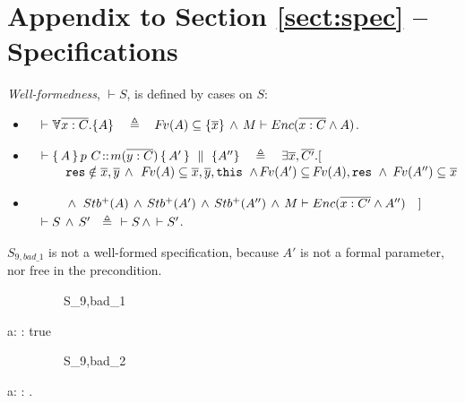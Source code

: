 \section{Appendix to Section \ref{sect:spec} -- Specifications}
\label{app:spec}


\begin{definition}      {\emph{Well-formedness}},  $\vdash S$,  is   defined by cases on $S$:\\
\label{f:holistic-wff}

\begin{itemize}
\item
  $\strut \ \  \vdash {\TwoStatesN {\overline {x:C}} {A}} \ \ \ \triangleq\  \ \ \fv(A)\subseteq\{  \overline x \}\,\wedge\, {M \vdash \encaps {\sdN{\overline {x: C}} \wedge A}} $.
  \item
 $\strut \ \  \vdash {\mprepostN{A}{p\ C}{m}{y}{C}{A'} {A''}}\ \ \ \triangleq\  \ \  \exists \overline x, \overline {C'}.[ $\\
  $\strut \hspace{1cm}  {{\mbox{\normalfont{\texttt{res}}}\notin \overline{x}, \overline{y}}}\,  \wedge\,  \ {{{\hspace{-1pt}F\hspace{-1pt}}v(A)\subseteq \overline{x},\overline y, \mbox{\normalfont{\texttt{this}}}}}\   \wedge {\hspace{-1pt}F\hspace{-1pt}}v(A')\subseteq  {\hspace{-1pt}F\hspace{-1pt}}v(A),\mbox{\normalfont{\texttt{res}}}\   \wedge\  {\hspace{-1pt}F\hspace{-1pt}}v(A'')\subseteq  {{\overline{x}}} $
  \item
    $\strut \hspace{1cm}\wedge\  {Stb^+( A )}\, \wedge\, {Stb^+( A' )}\, \wedge \,{Stb^+( A'' )}\, \wedge  \,  M \vdash {\ensuremath Enc( \overline {x: C'} \wedge A'' )}\ \ \  ]$ \\
  $\strut \ \   \vdash S\, \wedge \, S' \ \ \triangleq \ \  \vdash S\, \wedge\, \vdash S'  $.  
\end{itemize}

\end{definition}

 \begin{example}
$S_{9,bad\_1}$ is not a well-formed specification, because $A'$ is not a formal parameter, nor free in the precondition. 

   {\sprepost
		{\strut \ \ \ \ \ \ \ \ \ S_{9,bad\_1} }
		{  a: \wedge  {} }
		{} {} {:}
		{   \wedge  {}  }
		{  true }
}
		
 {\sprepost
		{\strut \ \ \ \ \ \ \ \ \ S_{9,bad\_2} }
		{  a: \wedge  {} }
		{} {} {:}
		{   \wedge  {}  }
		{  .\balance \ }

}
\end{example}

